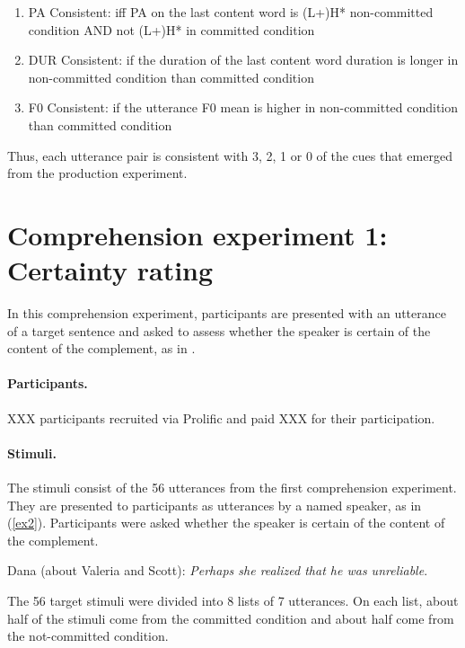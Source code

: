 \documentclass[dina4,12pt,fleqn]{article}
\newcommand{\6}{\mbox{$[\hspace*{-.6mm}[$}}
\newcommand{\9}{\mbox{$]\hspace*{-.6mm}]$}}
\begin{document}
\begin{itemize}[leftmargin=12pt]
\begin{enumerate}[noitemsep]
    \item PA Consistent: iff PA on the last content word is (L+)H* non-committed condition AND not (L+)H* in committed condition
    \item DUR Consistent: if the duration of the last content word duration is longer in non-committed condition than committed condition
    \item F0 Consistent: if the utterance F0 mean is higher in non-committed condition than committed condition
\end{enumerate}

Thus, each utterance pair is consistent with 3, 2, 1 or 0 of the cues that emerged from the production experiment. 

\end{itemize}


\section{Comprehension experiment 1: Certainty rating}

In this comprehension experiment, participants are presented with an utterance of a target sentence and asked to assess whether the speaker is certain of the content of the complement, as in \citealt{tonhauser-2016,stevens-etal-2017,tbd-variability}.

\paragraph{Participants.} XXX participants recruited via Prolific  and paid {XXX} for their participation.

\paragraph{Stimuli.} The stimuli consist of the 56 utterances from the first comprehension experiment. They are presented to participants as utterances by a named speaker, as in (\ref{ex2}). Participants were asked whether the speaker is certain of the content of the complement.

\begin{exe}
\ex\label{ex2} Dana (about Valeria and Scott): {\em Perhaps she realized that he was unreliable}.
\end{exe}

The 56 target stimuli were divided into 8 lists of 7 utterances. On each list, about half of the stimuli come from the committed condition and about half come from the not-committed condition. 
\end{document}
